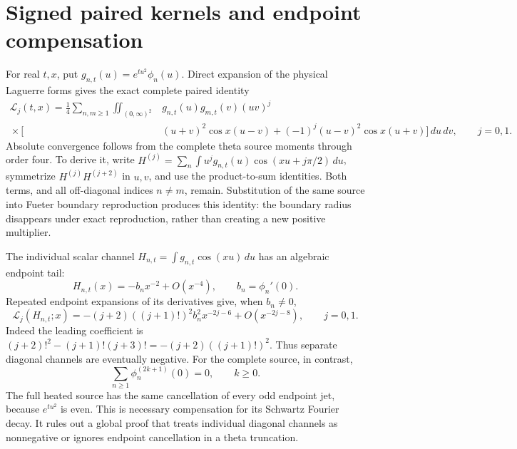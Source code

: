 \documentclass[11pt]{article}
\numberwithin{equation}{section}
\theoremstyle{definition}
\theoremstyle{remark}
\begin{document}
\section{Signed paired kernels and endpoint compensation}
\label{sec:paired-compensation}

For real \(t,x\), put \(g_{n,t}(u)=e^{tu^2}\phi_n(u)\).
Direct expansion of the physical Laguerre forms gives the exact
complete paired identity
\begin{equation}
\begin{split}
 \mathscr L_j(t,x)=\frac14\sum_{n,m\geq1}
 \iint_{(0,\infty)^2}
 &g_{n,t}(u)g_{m,t}(v)(uv)^j\\
 {}\times\bigl[&(u+v)^2\cos x(u-v)
 +(-1)^j(u-v)^2\cos x(u+v)\bigr]\,du\,dv,
 \qquad j=0,1 .
\end{split}
\label{eq:complete-paired-kernel}
\end{equation}
Absolute convergence follows from the complete theta source moments
through order four.  To derive it, write
\(H^{(j)}=\sum_n\int u^jg_{n,t}(u)\cos(xu+j\pi/2)\,du\),
symmetrize \(H^{(j)}H^{(j+2)}\) in \(u,v\), and use the
product-to-sum identities.  Both terms, and all off-diagonal
indices \(n\ne m\), remain.  Substitution of the same source into
Fueter boundary reproduction produces this identity: the boundary
radius disappears under exact reproduction, rather than creating a
new positive multiplier.

The individual scalar channel \(H_{n,t}=\int g_{n,t}\cos(xu)\,du\)
has an algebraic endpoint tail:
\[
 H_{n,t}(x)=-b_nx^{-2}+O(x^{-4}),
 \qquad b_n=\phi_n'(0).
\]
Repeated endpoint expansions of its derivatives give, when \(b_n\ne0\),
\begin{equation}
 \mathscr L_j(H_{n,t};x)=
 -(j+2)((j+1)!)^2b_n^2x^{-2j-6}
 +O(x^{-2j-8}),\qquad j=0,1 .
 \label{eq:individual-negative-tail}
\end{equation}
Indeed the leading coefficient is
\((j+2)!^2-(j+1)!(j+3)!=-(j+2)((j+1)!)^2\).
Thus separate diagonal channels are eventually negative.
For the complete source, in contrast,
\[
 \sum_{n\geq1}\phi_n^{(2k+1)}(0)=0,\qquad k\geq0.
\]
The full heated source has the same cancellation of every odd
endpoint jet, because \(e^{tu^2}\) is even.
This is necessary compensation for its Schwartz Fourier decay.
It rules out a global proof that treats individual diagonal channels
as nonnegative or ignores endpoint cancellation in a theta truncation.
\end{document}
